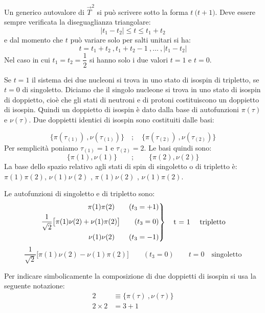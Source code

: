 Un generico autovalore di $\vec{T}^2$ si può scrivere sotto la forma $ t \ 
\bigl
( t + 1 \bigr ) $. Deve essere sempre verificata la diseguaglianza triangolare:
\begin{equation*}
| t_{1} - t_{2} | \le t \le t_1 + t_2
\end{equation*}
e dal momento che $t$ può variare solo per salti unitari si ha:
\begin{equation*}
t = t_1+ t_2 \ , t_1 + t_2 -1 \ , \dots \ , | t_1 - t_2 |
\end{equation*}
Nel caso in cui $t_1 = t_2 = \dfrac{1}{2}$ si hanno solo i due valori $ t = 1 $
e $ t = 0 $.

Se $t = 1$ il sistema dei due nucleoni si trova in uno stato di isospin di
tripletto, se $ t = 0$ di singoletto. Diciamo che il singolo nucleone si trova
in uno stato di isospin di doppietto, cioè che gli stati di neutroni e di
protoni costituiscono un doppietto di isospin. Quindi un doppietto di isospin è
dato dalla base di autofunzioni $\pi(\tau)$ e $\nu(\tau)$. Due doppietti
identici di isospin sono costituiti dalle basi:

\begin{equation*}
\bigl\{ \pi (\tau_{(1)}) \ , \nu(\tau_{(1)}) \bigr\} \quad ;	\quad 
\bigl\{\pi(\tau_{(2)}) \ , \nu(\tau_{(2)}) \bigr\} 
\end{equation*}
Per semplicità poniamo $\tau_{(1)} = 1$ e $\tau_{(2)} = 2$. Le basi quindi 
sono:
\begin{equation*}
\bigl\{ \pi (1), \nu(1) \bigr\} \qquad; \qquad \bigl\{ \pi(2), \nu(2) \bigr\}
\end{equation*}
La base dello spazio relativo agli stati di spin di singoletto o di tripletto 
è: 
$\pi(1) \pi(2)$, $\nu(1) \nu (2)$ , $\pi(1) \nu (2)$ , $\nu (1) \pi (2)$.

Le autofunzioni di singoletto e di tripletto sono:
\[
\left.
\begin{aligned}
\pi (1) \pi (2) 	\qquad (t_3 = + 1) \\
\dfrac{1}{\sqrt{2}} \bigl [\pi(1) \nu(2) + \nu (1) \pi(2) \bigr] 	\qquad 
(t_3 = 0) \\
\nu (1) \nu (2) 	\qquad (t_3= -1) 
\end{aligned}
\right\}
\quad
\text{t = 1 \quad tripletto}
\]
\begin{equation*}
\dfrac{1}{\sqrt{2}} \bigl [\pi(1) \nu(2) - \nu (1) \pi(2) \bigr] 	\qquad 
(t_3 = 0) 	\qquad t = 0 \quad  \text{singoletto}
\end{equation*} 

Per indicare simbolicamente la composizione di due doppietti di isospin si usa
la seguente notazione:
\begin{align*}
2 &\equiv	\bigl\{ \pi(\tau) \ , \nu(\tau) \bigr\} \\
2 \times 2 &= 3 + 1
\end{align*}

